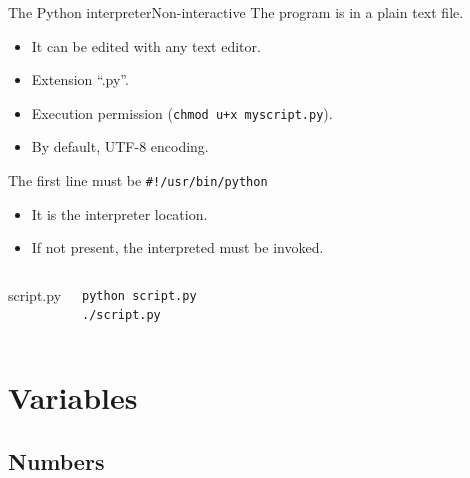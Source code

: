 \documentclass[10pt,compress]{beamer} %
\begin{document}
\begin{frame}[fragile]{The Python interpreter}{Non-interactive}
	The program is in a plain text file.
		\begin{itemize}
		\item It can be edited with any text editor.
		\item Extension ``.py''.
		\item Execution permission (\texttt{chmod u+x myscript.py}).
		\item By default, UTF-8 encoding.
		\end{itemize}
	The first line must be \texttt{\#!/usr/bin/python}
		\begin{itemize}
		\item It is the interpreter location.
		\item If not present, the interpreted must be invoked.
		\end{itemize}

    \begin{columns}
	
		\vspace{-0.2cm}
		\begin{exampleblock}{script.py}
		\vspace{-0.2cm}
			
		\end{exampleblock}

    	\begin{exampleblock}{}
\begin{verbatim}
python script.py
./script.py
\end{verbatim}
		\end{exampleblock}
	\end{columns}
\end{frame}

\section{Variables}
\subsection{Numbers}
\end{document}
